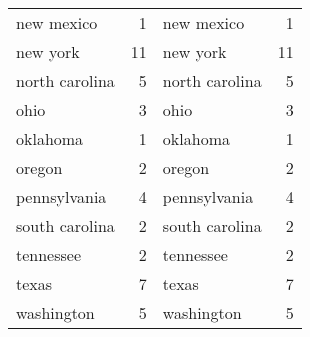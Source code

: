 \begin{table}[]
\begin{tabular}{lrlr}
new mexico        & 1            & new mexico     & 1            \\
new york          & 11           & new york       & 11           \\
north carolina    & 5            & north carolina & 5            \\
ohio              & 3            & ohio           & 3            \\
oklahoma          & 1            & oklahoma       & 1            \\
oregon            & 2            & oregon         & 2            \\
pennsylvania      & 4            & pennsylvania   & 4            \\
south carolina    & 2            & south carolina & 2            \\
tennessee         & 2            & tennessee      & 2            \\
texas             & 7            & texas          & 7            \\
washington        & 5            & washington     & 5           
\end{tabular}
\end{table}